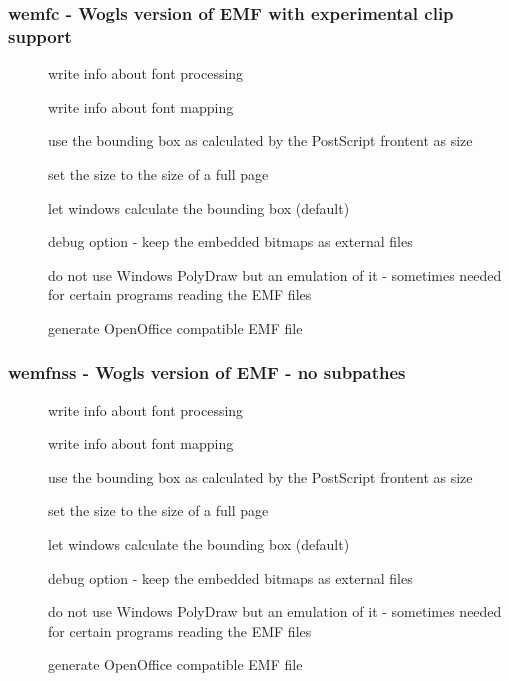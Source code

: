 \documentclass[english,a4paper]{article}
\begin{document}
\subsubsection{wemfc - Wogls version of EMF with experimental clip support}
\begin{description}
\item[] 
write info about font processing


\item[] 
write info about font mapping


\item[] 
use the bounding box as calculated by the PostScript frontent as size


\item[] 
set the size to the size of a full page


\item[] 
let windows calculate the bounding box (default)


\item[] 
debug option - keep the embedded bitmaps as external files 


\item[] 
do not use Windows PolyDraw but an emulation of it - sometimes needed for certain programs reading the EMF files


\item[] 
generate OpenOffice compatible EMF file


\end{description}
\subsubsection{wemfnss - Wogls version of EMF - no subpathes }
\begin{description}
\item[] 
write info about font processing


\item[] 
write info about font mapping


\item[] 
use the bounding box as calculated by the PostScript frontent as size


\item[] 
set the size to the size of a full page


\item[] 
let windows calculate the bounding box (default)


\item[] 
debug option - keep the embedded bitmaps as external files 


\item[] 
do not use Windows PolyDraw but an emulation of it - sometimes needed for certain programs reading the EMF files


\item[] 
generate OpenOffice compatible EMF file


\end{description}
\end{document}

